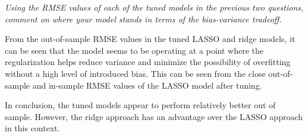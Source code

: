 \documentclass{article}
\begin{document}
\medskip
\textit{Using the RMSE values of each of the tuned models in the previous two questions, comment on where your model stands in terms of the bias-variance tradeoff.}

\medskip
From the out-of-sample RMSE values in the tuned LASSO and ridge models, it can be seen that the model seems to be operating at a point where the regularization helps reduce variance and minimize the possibility of overfitting without a high level of introduced bias. This can be seen from the close out-of-sample and in-sample RMSE values of the LASSO model after tuning.

\medskip
In conclusion, the tuned models appear to perform relatively better out of sample. However, the ridge approach has an advantage over the LASSO approach in this context.
\end{document}
